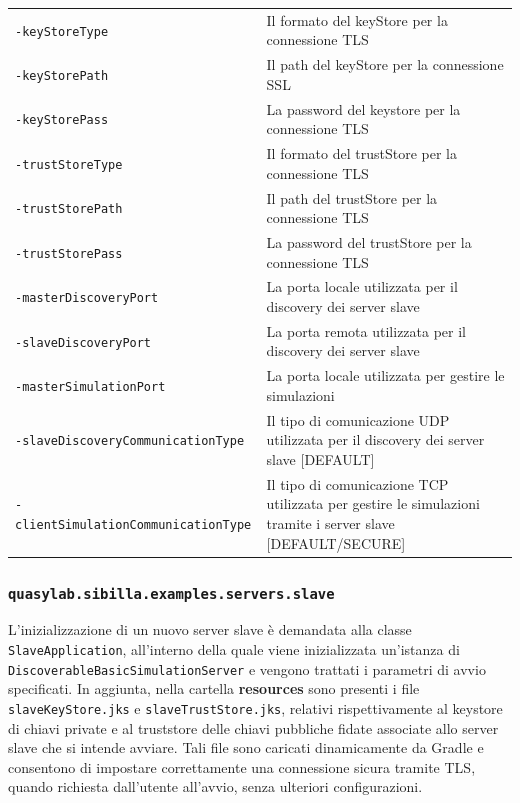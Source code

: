 \begin{table}[H]
    \begin{tabularx}{\linewidth}{ l X }
        \texttt{-keyStoreType}         & Il formato del keyStore per la connessione TLS              \\
        \texttt{-keyStorePath}         & Il path del keyStore per la connessione SSL                  \\
        \texttt{-keyStorePass}         & La password del keystore per la connessione TLS               \\
        \texttt{-trustStoreType}       & Il formato del trustStore per la connessione TLS            \\
        \texttt{-trustStorePath}       & Il path del trustStore per la connessione TLS                \\
        \texttt{-trustStorePass}       & La password del trustStore per la connessione TLS            \\
        \texttt{-masterDiscoveryPort}  & La porta locale utilizzata per il discovery dei server slave \\
        \texttt{-slaveDiscoveryPort}   & La porta remota utilizzata per il discovery dei server slave \\
        \texttt{-masterSimulationPort} & La porta locale utilizzata per gestire le simulazioni        \\
        \texttt{-slaveDiscoveryCommunicationType}   & Il tipo di comunicazione UDP utilizzata per il discovery dei server slave {[}DEFAULT{]}     \\
        \texttt{-clientSimulationCommunicationType} & Il tipo di comunicazione TCP utilizzata per gestire le simulazioni tramite i server slave {[}DEFAULT/SECURE{]}
    \end{tabularx}
\end{table}

\subsubsection{\texttt{quasylab.sibilla.examples.servers.slave}}

L'inizializzazione di un nuovo server slave è demandata alla classe \texttt{SlaveApplication}, all'interno della quale viene inizializzata un'istanza di \texttt{DiscoverableBasicSimulationServer} e vengono trattati i parametri di avvio specificati.
In aggiunta, nella cartella \textbf{resources} sono presenti i file \texttt{slaveKeyStore.jks} e \texttt{slaveTrustStore.jks}, relativi rispettivamente al keystore di chiavi private e al truststore delle chiavi pubbliche fidate associate allo server slave che si intende avviare. Tali file sono caricati dinamicamente da Gradle e consentono di impostare correttamente una connessione sicura tramite TLS, quando richiesta dall'utente all'avvio, senza ulteriori configurazioni.

